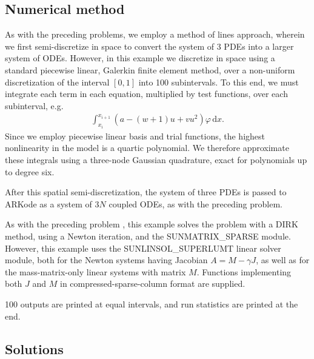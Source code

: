 \documentclass[letterpaper,10pt,english]{sphinxmanual}
\begin{document}
\subsection{Numerical method}
\label{\detokenize{c_serial:id23}}
As with the preceding problems, we employ a method of lines approach,
wherein we first semi-discretize in space to convert the system of 3
PDEs into a larger system of ODEs.  However, in this example we
discretize in space using a standard piecewise linear, Galerkin finite
element method, over a non-uniform discretization of the interval
\([0,1]\) into 100 subintervals.  To this end, we must integrate
each term in each equation, multiplied by test functions, over each
subinterval, e.g.
\begin{equation*}
\begin{split}\int_{x_i}^{x_{i+1}} \left(a - (w+1) u + v u^2\right) \varphi\,\mathrm dx.\end{split}
\end{equation*}
Since we employ piecewise linear basis and trial functions, the
highest nonlinearity in the model is a quartic polynomial.  We
therefore approximate these integrals using a three-node Gaussian
quadrature, exact for polynomials up to degree six.

After this spatial semi-discretization, the system of three PDEs is
passed to ARKode as a system of \(3N\) coupled ODEs, as with the
preceding problem.

As with the preceding problem {\hyperref[\detokenize{c_serial:ark-brusselator1d-klu}]{}}, this
example solves the problem with a DIRK method, using a Newton
iteration, and the SUNMATRIX\_SPARSE module.  However, this example
uses the SUNLINSOL\_SUPERLUMT linear solver module, both for the Newton
systems having Jacobian \(A=M-\gamma J\), as well as for the
mass-matrix-only linear systems with matrix \(M\).  Functions
implementing both \(J\) and \(M\) in compressed-sparse-column
format are supplied.

100 outputs are printed at equal intervals, and run statistics
are printed at the end.


\subsection{Solutions}
\label{\detokenize{c_serial:id24}}
\noindent{}

\noindent{}
\end{document}
